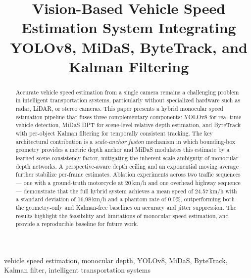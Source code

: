 \documentclass[conference]{IEEEtran}
\begin{document}
\title{Vision-Based Vehicle Speed Estimation System Integrating\\
YOLOv8, MiDaS, ByteTrack, and Kalman Filtering}

\author{
}

\maketitle

\begin{abstract}
Accurate vehicle speed estimation from a single camera remains
a challenging problem in intelligent transportation systems,
particularly without specialized hardware such as radar, LiDAR,
or stereo cameras. This paper presents a hybrid monocular speed
estimation pipeline that fuses three complementary components:
YOLOv8 for real-time vehicle detection, MiDaS DPT for
scene-level relative depth estimation, and ByteTrack with
per-object Kalman filtering for temporally consistent tracking.
The key architectural contribution is a \emph{scale-anchor
fusion} mechanism in which bounding-box geometry provides a
metric depth anchor and MiDaS modulates this estimate by a
learned scene-consistency factor, mitigating the inherent scale
ambiguity of monocular depth networks. A perspective-aware
depth ceiling and an exponential moving average further stabilize
per-frame estimates. Ablation experiments across two traffic
sequences --- one with a ground-truth motorcycle at 20\,km/h
and one overhead highway sequence --- demonstrate that the full
hybrid system achieves a mean speed of 24.57\,km/h with a
standard deviation of 16.98\,km/h and a phantom rate of 0.0\%,
outperforming both the geometry-only and Kalman-free baselines
on accuracy and jitter suppression. The results highlight the
feasibility and limitations of monocular speed estimation,
and provide a reproducible baseline for future work.
\end{abstract}

\begin{IEEEkeywords}
vehicle speed estimation, monocular depth, YOLOv8, MiDaS,
ByteTrack, Kalman filter, intelligent transportation systems
\end{IEEEkeywords}
\end{document}
